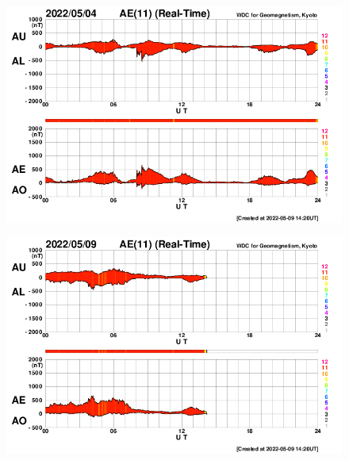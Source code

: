\documentclass[a4paper, 10pt]{article}
\begin{document}
                     \begin{figure}[H]
    
                        \centering
   
                             \includegraphics[width=14cm]{./figures//figureGeomag_2.png}

                        \end{figure}

                     \begin{figure}[H]
    
                        \centering
   
                             \includegraphics[width=14cm]{./figures//figureGeomag_3.png}

                        \end{figure}
\end{document}
